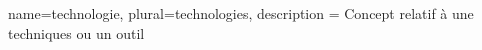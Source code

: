 {
  name=technologie, 
  plural=technologies,
  description = {Concept relatif à une techniques ou un outil}
}



